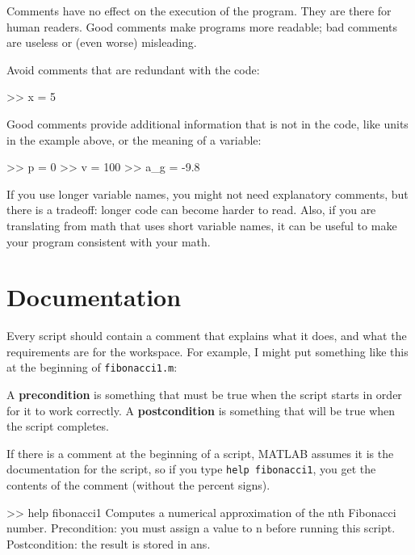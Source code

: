 \documentclass[
]{book}
\numberwithin{Answer}{chapter}
\numberwithin{Exercise}{chapter}
\begin{document}
Comments have no effect on the execution of the program.  They
are there for human readers.  Good comments make programs more
readable; bad comments are useless or (even worse) misleading.

Avoid comments that are redundant with the code:

\begin{code}
>> x = 5        %
\end{code}

Good comments provide additional information that is not in the
code, like units in the example above, or the meaning of a variable:

\begin{code}
>> p = 0         %
>> v = 100       %
>> a_g = -9.8    %
\end{code}

If you use longer variable names, you might not need explanatory
comments, but there is a tradeoff: longer code can become harder
to read.
Also, if you are translating from math
that uses short variable names, it can be useful to make your
program consistent with your math.


\section{Documentation}

Every script should contain a comment that explains
what it does, and what the requirements are for the workspace.  For
example, I might put something like this at the beginning of
{\tt fibonacci1.m}:

\begin{code}
\end{code}

A {\bf precondition} is something that must be true when the script
starts in order for it to work correctly.  A {\bf postcondition}
is something that will be true when the script completes.

If there is a comment at the beginning of a script, MATLAB assumes
it is the documentation for the script, so if you type {\tt help
fibonacci1}, you get the contents of the comment (without the percent
signs).

\begin{code}
>> help fibonacci1
  Computes a numerical approximation of the nth Fibonacci number.  
  Precondition: you must assign a value to n before running this script.
  Postcondition: the result is stored in ans.
\end{code}
\end{document}
